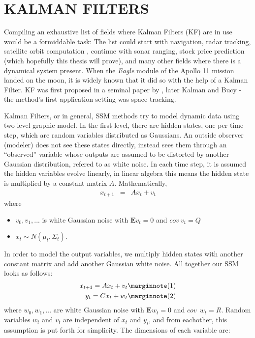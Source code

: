 \chapter{KALMAN FILTERS}

Compiling an exhaustive list of fields where Kalman Filters (KF) are in use
would be a formiddable task: The list could start with navigation, radar
tracking, satellite orbit computation \cite{welling}, continue with sonar
ranging, stock price prediction (which hopefully this thesis will prove), and
many other fields where there is a dynamical system present. When the {\em
  Eagle} module of the Apollo 11 mission landed on the moon, it is widely known
that it did so with the help of a Kalman Filter. KF was first proposed in a
seminal paper by \cite{kalman}, later Kalman and Bucy \cite{kalman2} - the
method's first application setting was space tracking.

Kalman Filters, or in general, SSM methods try to model dynamic data using
two-level graphic model. In the first level, there are hidden states, one per
time step, which are random variables distributed as Gaussians. An outside
observer (modeler) does not see these states directly, instead sees them through
an ``observed'' variable whose outputs are assumed to be distorted by another
Gaussian distribution, refered to as white noise. In each time step, it is
assumed the hidden variables evolve linearly, in linear algebra this means the
hidden state is multiplied by a constant matrix $A$. Mathematically,
\begin{eqnarray*}
x_{t+1} &=& Ax_t + v_t 
\end{eqnarray*}
where
\begin{itemize}
   \item $v_0,v_1,...$ is white Gaussian noise with $\mathbf{E}v_t = 0$ and $cov
   \: v_t = Q$
   \item $x_t \sim N(\mu_t, \Sigma_t)$.
\end{itemize}
In order to model the output variables, we multiply hidden states with another
constant matrix and add another Gaussian white noise. All together our SSM looks
as follows:
\begin{eqnarray*}
x_{t+1} = Ax_t + v_t \mlabel{1}\\
y_t = Cx_t + w_t \mlabel{2}
\end{eqnarray*}
where $w_0,w_1,...$ are white Gaussian noise with $\mathbf{E}w_t = 0$ and $cov
\:\: w_t = R$. Random variables $w_t$ and $v_t$ are independent of $x_t$
and $y_t$, and from eachother, this assumption is put forth for simplicity. The
dimensions of each variable are:

